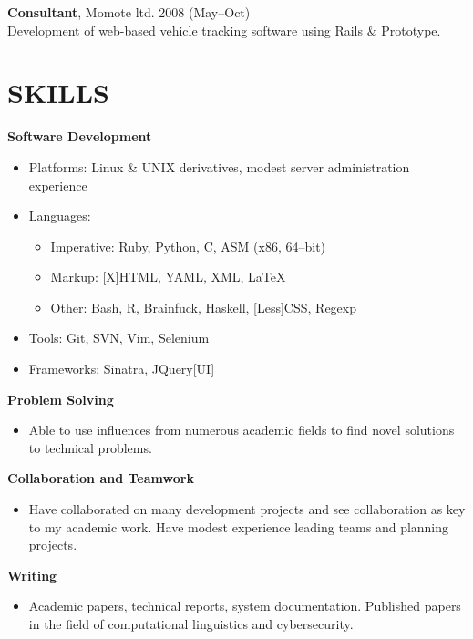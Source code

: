 \documentclass{res}
\begin{document}
\begin{resume}
    {\bf Consultant},
    Momote ltd.
    2008 (May--Oct)\\
    Development of web-based vehicle tracking software using Rails \& Prototype.




\section{SKILLS}
\vspace{0.1in}

   {\bf Software Development}
        \begin{itemize}
            \item[] Platforms: Linux \& UNIX derivatives, modest server administration experience
            \item[] Languages:
                \begin{itemize}
                    \item Imperative: Ruby, Python, C, ASM (x86, 64--bit)
                    \item Markup: [X]HTML, YAML, XML, \LaTeX
                    \item Other: Bash, R, Brainfuck, Haskell, [Less]CSS, Regexp
                \end{itemize}
            \item[] Tools: Git, SVN, Vim, Selenium
            \item[] Frameworks: Sinatra, JQuery[UI]
        \end{itemize}

  {\bf Problem Solving}
    \begin{itemize}
      \item[] Able to use influences from numerous academic fields to find novel solutions to technical problems.
      \end{itemize}

  {\bf Collaboration and Teamwork}
    \begin{itemize}
      \item[] Have collaborated on many development projects and see collaboration as key to my academic work.  Have modest experience leading teams and planning projects.
      \end{itemize}

  {\bf Writing}
    \begin{itemize} %
      \item[] Academic papers, technical reports, system documentation.
        Published papers in the field of computational linguistics and cybersecurity.
      \end{itemize}


\end{resume}
\end{document}
